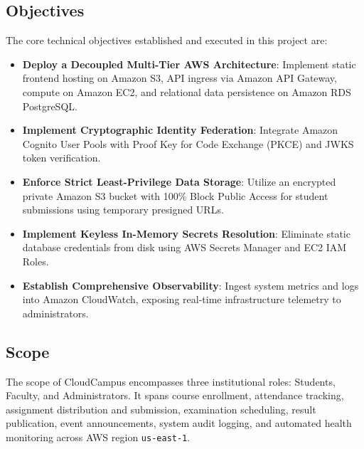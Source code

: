 \subsection{Objectives}
The core technical objectives established and executed in this project are:
\begin{itemize}[leftmargin=*,itemsep=1pt]
    \item \textbf{Deploy a Decoupled Multi-Tier AWS Architecture}: Implement static frontend hosting on Amazon S3, API ingress via Amazon API Gateway, compute on Amazon EC2, and relational data persistence on Amazon RDS PostgreSQL.
    \item \textbf{Implement Cryptographic Identity Federation}: Integrate Amazon Cognito User Pools with Proof Key for Code Exchange (PKCE) and JWKS token verification.
    \item \textbf{Enforce Strict Least-Privilege Data Storage}: Utilize an encrypted private Amazon S3 bucket with 100\% Block Public Access for student submissions using temporary presigned URLs.
    \item \textbf{Implement Keyless In-Memory Secrets Resolution}: Eliminate static database credentials from disk using AWS Secrets Manager and EC2 IAM Roles.
    \item \textbf{Establish Comprehensive Observability}: Ingest system metrics and logs into Amazon CloudWatch, exposing real-time infrastructure telemetry to administrators.
\end{itemize}

\subsection{Scope}
The scope of CloudCampus encompasses three institutional roles: Students, Faculty, and Administrators. It spans course enrollment, attendance tracking, assignment distribution and submission, examination scheduling, result publication, event announcements, system audit logging, and automated health monitoring across AWS region \texttt{us-east-1}.
